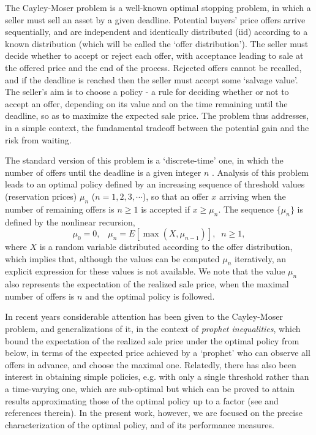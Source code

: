 \documentclass{article}
\numberwithin{equation}{section}
\begin{document}
The Cayley-Moser problem \cite{Cayley,Moser} is a well-known 
optimal stopping problem, in which a seller 
must sell an asset by a given deadline. Potential buyers' price offers arrive sequentially, and are independent and identically distributed (iid) according to a known distribution (which will be called the `offer distribution'). The seller must decide whether to 
accept or reject each offer, with acceptance leading to sale at the offered price and the end of the process. Rejected offers cannot be recalled, and if the deadline is reached then the seller must accept some `salvage value'. The seller's aim is to choose a policy - a rule for deciding whether 
or not to accept an offer, depending on its 
value and on the time remaining until the deadline, 
so as to maximize the expected sale price. The problem thus addresses, in a simple context, the fundamental tradeoff between the potential gain and the risk from waiting.

The standard version of this problem is a `discrete-time' one, in which the number of offers until the deadline is a given integer $n$ \cite{Bauerle,DeGroot,Ferguson,Gilbert,Guttman,Hayes,Moser}. Analysis of this problem leads to an optimal policy defined by an increasing sequence of threshold values (reservation prices) $\mu_n$ ($n=1,2,3,\cdots$), so that an offer $x$ arriving when
the number of remaining offers is $n\geq 1$ is  
accepted if $x\geq\mu_n$. The sequence $\{\mu_n\}$ is defined by 
the nonlinear recursion,
\begin{equation}\label{discrete}\mu_0=0,\;\;\;\mu_n=E[\max(X,\mu_{n-1})],\;\;n\geq 1,\end{equation}
where $X$ is a random variable distributed according to the offer distribution,
which implies that, although the values can be computed $\mu_n$ iteratively,  an explicit expression for these values is not 
available. We note that the value $\mu_n$ also represents the expectation of the realized sale price, when the maximal number of offers is $n$ and the optimal policy is followed.

In recent years considerable attention has been given to the Cayley-Moser problem, and generalizations of it, in the context of {\it{prophet inequalities}}, which bound the expectation of the 
realized sale price under the optimal policy from below, in terms of the expected price achieved by a `prophet' who can observe all offers in advance, and choose the maximal one. Relatedly, there has also been interest in obtaining simple policies, e.g. with only a single threshold rather than a time-varying one, which are sub-optimal but which can be proved to attain results approximating those of the optimal policy up to a factor (see \cite{Allaart,Correa,Hill,Livanos,Lucier} and references therein). In the present work, however, we are focused on the precise characterization of the optimal policy, and of its performance measures.
\end{document}
